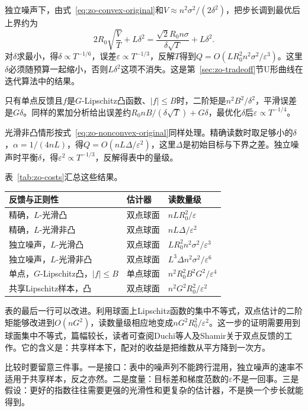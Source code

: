 独立噪声下，由式~\eqref{eq:zo-convex-original}和$V\approx n^2\sigma^2/(2\delta^2)$，把步长调到最优后上界约为
\[
 2R_0\sqrt{\frac{V}{T}}+L\delta^2=\frac{\sqrt{2}R_0n\sigma}{\delta\sqrt{T}}+L\delta^2.
\]
对$\delta$求最小，得$\delta\propto T^{-1/6}$，误差$\varepsilon\propto T^{-1/3}$，反解$T$得到$Q=O(LR_0^2n^2\sigma^2/\varepsilon^3)$。这里$\delta$必须随预算一起缩小，否则$L\delta^2$这项不消失。这是第~\ref{sec:zo-tradeoff}节U形曲线在迭代算法中的结果。

只有单点反馈且$f$是$G$-Lipschitz凸函数、$\lvert f\rvert\leq B$时，二阶矩是$n^2B^2/\delta^2$，平滑误差是$G\delta$。同样的累加分析给出误差约$R_0nB/(\delta\sqrt{T})+G\delta$，最优化$\delta$后$\varepsilon\propto T^{-1/4}$。

光滑非凸情形按式~\eqref{eq:zo-nonconvex-original}同样处理。精确读数时取足够小的$\delta$，$\alpha=1/(4nL)$，得$Q=O(nL\Delta/\varepsilon^2)$，这里$\Delta$是初始目标与下界之差。独立噪声时平衡$\delta$，得$\varepsilon^2\propto T^{-1/3}$，反解得表中的量级。

表~\ref{tab:zo-costs}汇总这些结果。

\begin{BookInlineTable}
  \centering
  \begin{tabular}{@{}lll@{}}
    \toprule
    反馈与正则性 & 估计器 & 读数量级\\
    \midrule
    精确，$L$-光滑凸 & 双点球面 & $nLR_0^2/\varepsilon$\\
    精确，$L$-光滑非凸 & 双点球面 & $nL\Delta/\varepsilon^2$\\
    独立噪声，$L$-光滑凸 & 双点球面 & $LR_0^2n^2\sigma^2/\varepsilon^3$\\
    独立噪声，$L$-光滑非凸 & 双点球面 & $L^3\Delta n^2\sigma^2/\varepsilon^6$\\
    单点，$G$-Lipschitz凸，$\lvert f\rvert\leq B$ & 单点球面 & $n^2R_0^2B^2G^2/\varepsilon^4$\\
    共享Lipschitz样本，凸 & 双点球面 & $n^2G^2R_0^2/\varepsilon^2$\\
    \bottomrule
  \end{tabular}
  \caption{本章简单估计器达到精度$\varepsilon$的读数量级，略去常数。凸问题的精度指目标差，非凸问题指$\lVert\nabla f\rVert_2\leq\varepsilon$；末行由$\lVert\hat{\bm{g}}\rVert_2\leq nG$的粗略界得到。这些都是上界，不是问题本身的下界。}
  \label{tab:zo-costs}
\end{BookInlineTable}

表的最后一行可以改进。利用球面上Lipschitz函数的集中不等式，双点估计的二阶矩能够改进到$O(nG^2)$，读数量级相应地变成$nG^2R_0^2/\varepsilon^2$。这一步的证明需要用到球面集中不等式，篇幅较长，读者可查阅Duchi等人及Shamir关于双点反馈的工作。它的含义是：共享样本下，配对的收益是把维数从平方降到一次方。

比较时要留意三件事。一是接口：表中的噪声列不能跨行混用，独立噪声的速率不适用于共享样本，反之亦然。二是度量：目标差和梯度范数的$\varepsilon$不是一回事。三是假设：更好的指数往往需要更强的光滑性和更复杂的估计器，不是换一个步长就能得到。
